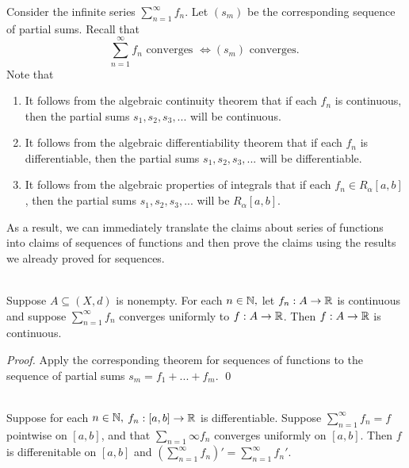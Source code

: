 \begin{observation}
    Consider the infinite series $\sum \limits_{n=1}^\infty f_n.$ Let $(s_m)$ be the corresponding sequence of partial sums. Recall that
    \[\sum_{n=1}^\infty f_n \text{ converges } \iff (s_m) \text{ converges. }\]
    Note that
    \begin{enumerate}[$*)$]
        \item It follows from the algebraic continuity theorem that if each $f_n$ is continuous, then the partial sums $s_1, s_2, s_3, ...$ will be continuous.
        \item It follows from the algebraic differentiability theorem that if each $f_n$ is differentiable, then the partial sums $s_1, s_2, s_3, ...$ will be differentiable.
        \item It follows from the algebraic properties of integrals that if each $f_n \in R_\alpha[a,b]$, then the partial sums $s_1, s_2, s_3, ...$ will be $R_\alpha [a,b]$.
    \end{enumerate}
    As a result, we can immediately translate the claims about series of functions into claims of sequences of functions and then prove the claims using the results we already proved for sequences.
\end{observation}

\begin{theorem} \leavevmode \\
    Suppose $A \subseteq (X, d)$ is nonempty. For each $n \in \mathbb{N},$ let $f_n: A \to \mathbb{R}$ is continuous and suppose $\sum \limits_{n=1}^\infty f_n$ converges uniformly to $f:A\to \mathbb{R}$. Then $f: A \to \mathbb{R}$ is continuous.
\end{theorem}

\begin{proof}
    Apply the corresponding theorem for sequences of functions to the sequence of partial sums $s_m = f_1 + ... + f_m.$
    \qed
\end{proof}

\begin{theorem} \leavevmode \\
    Suppose for each $n \in \mathbb{N},$ $f_n:[a,b] \to \mathbb{R}$ is differentiable. Suppose $\sum_{n=1}^\infty f_n = f$ pointwise on $[a,b]$, and that $\sum_{n=1}\infty f_n$ converges uniformly on $[a,b].$ Then $f$ is differenitable on $[a,b]$ and $\left(\sum_{n=1}^\infty f_n\right)' = \sum_{n=1}^\infty f_n'.$
\end{theorem}

